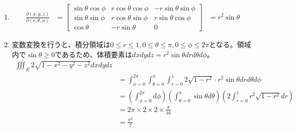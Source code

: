 \begin{souanswer}
\begin{enumerate}
\begin{align*}
    &= \int_{\theta= 0}^{2\pi}\int_{r= 0}^1 r^2(1+ 3\sin^2{theta})\cdot 2rdrd\theta\\
    &= \left(\int_{\theta= 0}^{2\pi} (1+ 3\sin^2{\theta})d\theta\right)\left(\int_{r= 0}^1 2r^3dr\right)\\
    &= \left([\theta]_{\theta= 0}^{2\pi}+ 3\pi\right)\left[\frac{r^4}{2}\right]_{r= 0}^1\\
    &= \frac{5\pi}{2}
\end{align*}
    \item 
\begin{align*}
    \frac{\partial (x, y, z)}{\partial (r, \theta, \phi)}
    &= 
    \begin{bmatrix}
        \sin{\theta}\cos{\phi}& r\cos{\theta}\cos{\phi}& -r\sin{\theta}\sin{\phi}\\
        \sin{\theta}\sin{\phi}& r\cos{\theta}\sin{\phi}& r\sin{\theta}\cos{\phi}\\
        \cos{\theta}& -r\sin{\theta}& 0
    \end{bmatrix}
    &= r^2\sin{\theta}
\end{align*}
    \item 変数変換を行うと、積分領域は$0\le r\le 1, 0\le \theta\le \pi, 0\le \phi\le 2\pi$となる。領域内で$\sin{\theta}\ge 0$であるため、体積要素は$dxdydz= r^2\sin{\theta}drd\theta d\phi$。
\begin{align*}
    \iiint_E 2\sqrt{1- x^2- y^2- z^2}dxdydz\\
    &= \int_{\phi= 0}^{2\pi}\int_{\theta= 0}^\pi\int_{r= 0}^1 2\sqrt{1- r^2}\cdot r^2\sin{\theta}drd\theta d\phi\\
    &= \left(\int_{\phi= 0}^{2\pi}d\phi\right)\left(\int_{\theta= 0}^\pi \sin{\theta}d\theta\right)\left(2\int_{r= 0}^1 r^2\sqrt{1- r^2}dr\right)\\
    &= 2\pi\times 2\times 2\times \frac{\pi}{16}\\
    &= \frac{\pi^2}{2}
\end{align*}
\end{enumerate}
\end{souanswer}

